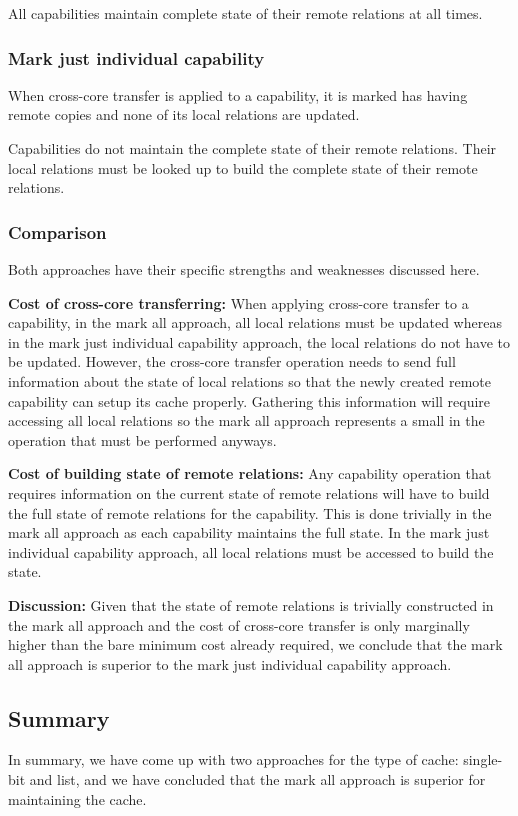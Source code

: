 \documentclass[a4paper,twoside]{report} %
\begin{document}
All capabilities maintain complete state of their remote relations at
all times.

\subsubsection{Mark just individual capability}
When cross-core transfer is applied to a capability, it is marked has
having remote copies and none of its local relations are updated.

Capabilities do not maintain the complete state of their remote
relations. Their local relations must be looked up to build the
complete state of their remote relations.

\subsubsection{Comparison}
Both approaches have their specific strengths and weaknesses discussed
here.

\textbf{Cost of cross-core transferring:} When applying cross-core
transfer to a capability, in the mark all approach, all local
relations must be updated whereas in the mark just individual
capability approach, the local relations do not have to be updated.
However, the cross-core transfer operation needs to send full
information about the state of local relations so that the newly
created remote capability can setup its cache properly. Gathering this
information will require accessing all local relations so the mark all
approach represents a small in the operation that must be performed
anyways.

\textbf{Cost of building state of remote relations:} Any capability
operation that requires information on the current state of remote
relations will have to build the full state of remote relations for
the capability. This is done trivially in the mark all approach as
each capability maintains the full state. In the mark just individual
capability approach, all local relations must be accessed to build the
state.

\textbf{Discussion:} Given that the state of remote relations is
trivially constructed in the mark all approach and the cost of
cross-core transfer is only marginally higher than the bare minimum
cost already required, we conclude that the mark all approach is
superior to the mark just individual capability approach.

\subsection{Summary}\label{subsec:cache:summary}
In summary, we have come up with two approaches for the type of cache:
single-bit and list, and we have concluded that the mark all approach
is superior for maintaining the cache.
\end{document}
